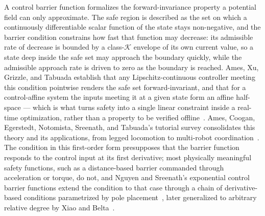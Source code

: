 A control barrier function formalizes the forward-invariance property a potential field can only approximate. The safe region is described as the set on which a continuously differentiable scalar function of the state stays non-negative, and the barrier condition constrains how fast that function may decrease: its admissible rate of decrease is bounded by a class-$\mathcal{K}$ envelope of its own current value, so a state deep inside the safe set may approach the boundary quickly, while the admissible approach rate is driven to zero as the boundary is reached. Ames, Xu, Grizzle, and Tabuada establish that any Lipschitz-continuous controller meeting this condition pointwise renders the safe set forward-invariant, and that for a control-affine system the inputs meeting it at a given state form an affine half-space --- which is what turns safety into a single linear constraint inside a real-time optimization, rather than a property to be verified offline~\cite{ames2017cbf}. Ames, Coogan, Egerstedt, Notomista, Sreenath, and Tabuada's tutorial survey consolidates this theory and its applications, from legged locomotion to multi-robot coordination~\cite{ames2019ecc}. The condition in this first-order form presupposes that the barrier function responds to the control input at its first derivative; most physically meaningful safety functions, such as a distance-based barrier commanded through acceleration or torque, do not, and Nguyen and Sreenath's exponential control barrier functions extend the condition to that case through a chain of derivative-based conditions parametrized by pole placement~\cite{nguyen2016exponential}, later generalized to arbitrary relative degree by Xiao and Belta~\cite{xiao2022highorder}.

